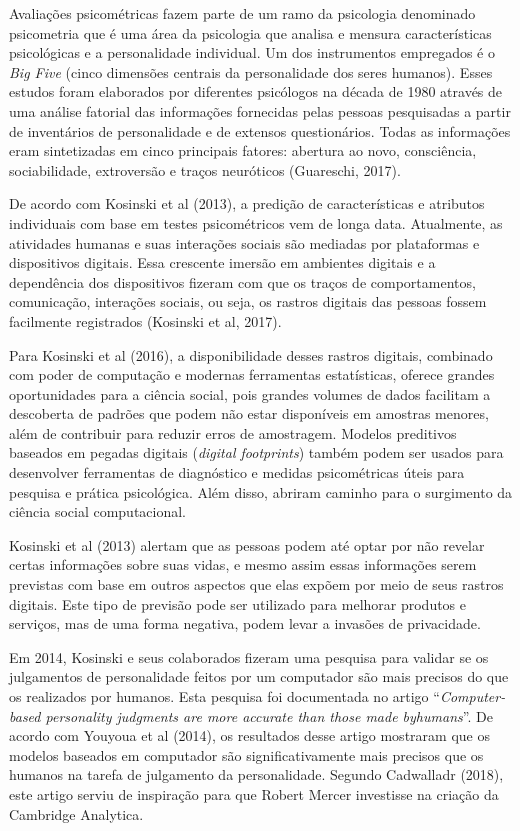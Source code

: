 Avaliações psicométricas fazem parte de um ramo da psicologia denominado
psicometria que é uma área da psicologia que analisa e mensura
características psicológicas e a personalidade individual. Um dos
instrumentos empregados é o \emph{Big Five} (cinco dimensões centrais da
personalidade dos seres humanos). Esses estudos foram elaborados por
diferentes psicólogos na década de 1980 através de uma análise fatorial
das informações fornecidas pelas pessoas pesquisadas a partir de
inventários de personalidade e de extensos questionários. Todas as
informações eram sintetizadas em cinco principais fatores: abertura ao
novo, consciência, sociabilidade, extroversão e traços neuróticos
(Guareschi, 2017).

De acordo com Kosinski et al (2013), a predição de características e
atributos individuais com base em testes psicométricos vem de longa
data. Atualmente, as atividades humanas e suas interações sociais são
mediadas por plataformas e dispositivos digitais. Essa crescente imersão
em ambientes digitais e a dependência dos dispositivos fizeram com que
os traços de comportamentos, comunicação, interações sociais, ou seja,
os rastros digitais das pessoas fossem facilmente registrados (Kosinski
et al, 2017).

Para Kosinski et al (2016), a disponibilidade desses rastros digitais,
combinado com poder de computação e modernas ferramentas estatísticas,
oferece grandes oportunidades para a ciência social, pois grandes
volumes de dados facilitam a descoberta de padrões que podem não estar
disponíveis em amostras menores, além de contribuir para reduzir erros
de amostragem. Modelos preditivos baseados em pegadas digitais
(\emph{digital footprints}) também podem ser usados para desenvolver
ferramentas de diagnóstico e medidas psicométricas úteis para pesquisa e
prática psicológica. Além disso, abriram caminho para o surgimento da
ciência social computacional.

Kosinski et al (2013) alertam que as pessoas podem até optar por não
revelar certas informações sobre suas vidas, e mesmo assim essas
informações serem previstas com base em outros aspectos que elas expõem
por meio de seus rastros digitais. Este tipo de previsão pode ser
utilizado para melhorar produtos e serviços, mas de uma forma negativa,
podem levar a invasões de privacidade.

Em 2014, Kosinski e seus colaborados fizeram uma pesquisa para validar
se os julgamentos de personalidade feitos por um computador são mais
precisos do que os realizados por humanos. Esta pesquisa foi documentada
no artigo ``\emph{Computer-based personality judgments are more accurate
than those made byhumans}''. De acordo com Youyoua et al (2014), os
resultados desse artigo mostraram que os modelos baseados em computador
são significativamente mais precisos que os humanos na tarefa de
julgamento da personalidade. Segundo Cadwalladr (2018), este artigo
serviu de inspiração para que Robert Mercer investisse na criação da
Cambridge Analytica.

